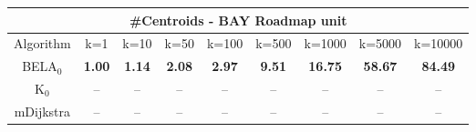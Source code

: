 \begin{tabular}{c|cccccccc}\toprule
\multicolumn{9}{c}{#Centroids - BAY Roadmap unit}\\ \midrule
Algorithm & k=1 & k=10 & k=50 & k=100 & k=500 & k=1000 & k=5000 & k=10000 \\ \midrule
BELA$_0$ & \textbf{1.00} & \textbf{1.14} & \textbf{2.08} & \textbf{2.97} & \textbf{9.51} & \textbf{16.75} & \textbf{58.67} & \textbf{84.49} \\
K$_0$ & -- & -- & -- & -- & -- & -- & -- & -- \\
mDijkstra & -- & -- & -- & -- & -- & -- & -- & -- \\ \bottomrule 
\end{tabular}
